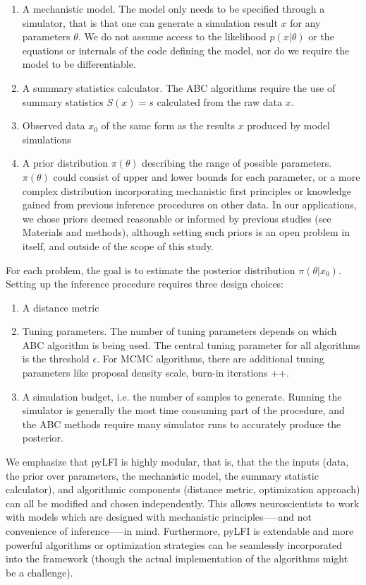 \begin{enumerate}
    \item A mechanistic model. The model only needs to be specified through a simulator, that is that one can generate a simulation result $x$ for any parameters $\theta$. We do not assume access to the likelihood $p(x | \theta)$ or the equations or internals of the code defining the model, nor do we require the model to be differentiable. 
    \item A summary statistics calculator. The ABC algorithms require the use of summary statistics $S(x)=s$ calculated from the raw data $x$. 
    \item Observed data $x_0$ of the same form as the results $x$ produced by model simulations
    \item A prior distribution $\pi (\theta)$ describing the range of possible parameters. $\pi (\theta)$ could consist of upper and lower bounds for each parameter, or a more complex distribution incorporating mechanistic first principles or knowledge gained from previous inference procedures on other data. In our applications, we chose priors deemed reasonable or informed by previous studies (see Materials and methods), although setting such priors is an open problem in itself, and outside of the scope of this study.
\end{enumerate}

For each problem, the goal is to estimate the posterior distribution $\pi(\theta | x_0)$. Setting up the inference procedure requires three design choices: 
\begin{enumerate}
    \item A distance metric
    \item Tuning parameters. The number of tuning parameters depends on which ABC algorithm is being used. The central tuning parameter for all algorithms is the threshold $\epsilon$. For MCMC algorithms, there are additional tuning parameters like proposal density scale, burn-in iterations ++. 
    \item A simulation budget, i.e. the number of samples to generate. Running the simulator is generally the most time consuming part of the procedure, and the ABC methods require many simulator runs to accurately produce the posterior. 
\end{enumerate}

We emphasize that pyLFI is highly modular, that is, that the the inputs (data, the prior over parameters, the mechanistic model, the summary statistic calculator), and algorithmic components (distance metric, optimization approach) can all be modified and chosen independently. This allows neuroscientists to work with models which are designed with mechanistic principles–—and not convenience of inference–—in mind.
Furthermore, pyLFI is extendable and more powerful algorithms or optimization strategies can be seamlessly incorporated into the framework (though the actual implementation of the algorithms might be a challenge).



